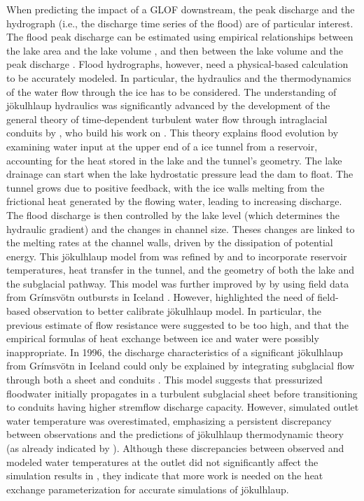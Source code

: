 When predicting the impact of a GLOF downstream, the peak discharge and the hydrograph (i.e., the discharge time series of the flood) are of particular interest. The flood peak discharge can be estimated using empirical relationships between the lake area and the lake volume \citep{Evans1986, Huggel&al2002, Cook&Quincey2015}, and then between the lake volume and the peak discharge \citep{Clague&Mathews1973, Haeberli1983, Costa1985, Evans1986, Walder&OConnor1997, Huggel&al2002}. Flood hydrographs, however, need a physical-based calculation to be accurately modeled. In particular, the hydraulics and the thermodynamics of the water flow through the ice has to be considered. The understanding of jökulhlaup hydraulics was significantly advanced by the development of the general theory of time-dependent turbulent water flow through intraglacial conduits by \cite{Nye1976}, who build his work on \cite{Roethlisberger1972,Shreve1972,Weertman1972}. This theory explains flood evolution by examining water input at the upper end of a ice tunnel from a reservoir, accounting for the heat stored in the lake and the tunnel's geometry. The lake drainage can start when the lake hydrostatic pressure lead the dam to float. The tunnel grows due to positive feedback, with the ice walls melting from the frictional heat generated by the flowing water, leading to increasing discharge. The flood discharge is then controlled by the lake level (which determines the hydraulic gradient) and the changes in channel size. Theses changes are linked to the melting rates at the channel walls, driven by the dissipation of potential energy. This jökulhlaup model from \cite{Nye1976} was refined by \cite{Spring&Hutter1981} and \cite{Clarke1982} to incorporate reservoir temperatures, heat transfer in the tunnel, and the geometry of both the lake and the subglacial pathway. This model was further improved by \cite{Clarke2003} by using field data from Grímsvötn outbursts in Iceland \citep[see][]{Bjornsson2010}. However, \cite{Clarke2003} highlighted the need of field-based observation to better calibrate jökulhlaup model. In particular, the previous estimate of flow resistance were suggested to be too high, and that the empirical formulas of heat exchange between ice and water were possibly inappropriate. In 1996, the discharge characteristics of a significant jökulhlaup from Grímsvötn in Iceland \citep{Bjornsson1996} could only be explained by integrating subglacial flow through both a sheet and conduits \citep{Flowers&al2004}. This model suggests that pressurized floodwater initially propagates in a turbulent subglacial sheet before transitioning to conduits having higher stremflow discharge capacity. However, simulated outlet water temperature was overestimated, emphasizing a persistent discrepancy between observations and the predictions of jökulhlaup thermodynamic theory (as already indicated by \cite{Clarke2003}). Although these discrepancies between observed and modeled water temperatures at the outlet did not significantly affect the simulation results in \cite{Flowers&al2004}, they indicate that more work is needed on the heat exchange parameterization for accurate simulations of jökulhlaup.

